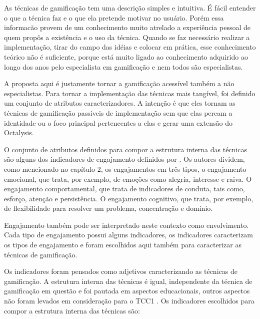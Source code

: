 As técnicas de gamificação tem uma descrição simples e intuitiva. É fácil entender o que a técnica faz e o que ela pretende motivar no usuário. Porém essa informacão provem de um conhecimento muito atrelado a experiência pessoal de quem propôs a existência e o uso da técnica. Quando se faz necessário realizar a implementação, tirar do campo das idéias e colocar em prática, esse conhecimento teórico não é suficiente, porque está muito ligado ao conhecimento adquirido ao longo dos anos pelo especialista em gamificação e nem todos são especialistas.

 A proposta aqui é justamente tornar a gamificação acessível também a não especialistas. Para tornar a implementação das técnicas mais tangível, foi definido um conjunto de atributos caracterizadores. A intenção é que eles tornam as técnicas de gamificação passíveis de implementação sem que elas percam a identidade ou o foco principal pertencentes a elas e gerar uma extensão do Octalysis.

 O conjunto de atributos definidos para compor a estrutura interna das técnicas são alguns dos indicadores de engajamento definidos por \cite{fredericks2004school}. Os autores dividem, como mencionado no capítulo 2, os engajamentos em três tipos, o engajamento emocional, que trata, por exemplo, de emoções como alegria, interesse e raiva.  O engajamento comportamental, que trata de indicadores de conduta, tais como, esforço, atenção e persistência. O engajamento cognitivo, que trata, por exemplo, de flexibilidade para resolver um problema, concentração e domínio.

 Engajamento também pode ser interpretado neste contexto como envolvimento. Cada tipo de engajamento possui alguns indicadores, os indicadores caracterizam os tipos de engajamento e foram escolhidos aqui também para caracterizar as técnicas de gamificação. 

 Os indicadores foram pensados como adjetivos caracterizando as técnicas de gamificação. A estrutura interna das técnicas é igual, independente da técnica de gamificação em questão e foi pautada em aspectos educacionais, outros aspectos não foram levados em consideração para o TCC1 . Os indicadores escolhidos para compor a estrutura interna das técnicas são: 


